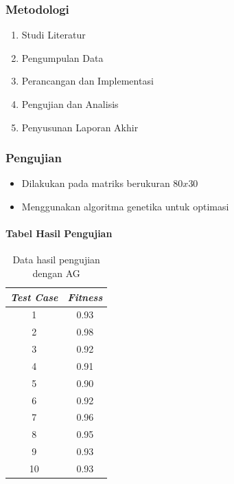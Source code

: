\documentclass[12pt]{beamer}
\begin{document}
	
	\begin{frame}
		\frametitle{Metodologi}
		\begin{enumerate}
			\item Studi Literatur
			\item Pengumpulan Data
			\item Perancangan dan Implementasi
			\item Pengujian dan Analisis
			\item Penyusunan Laporan Akhir
		\end{enumerate}
	\end{frame}
	
	\begin{frame}
		\frametitle{Pengujian}
		\begin{itemize}
			\item Dilakukan pada matriks berukuran $80 x 30$
			\item Menggunakan algoritma genetika untuk optimasi
		\end{itemize}
		\framesubtitle{Tabel Hasil Pengujian}
		\begin{table}
			\centering
			\begin{tabular}{|c|c|}
				\hline \textbf{\emph{Test Case}} & \textbf{\emph{Fitness}} \\ 
				\hline 1 & 0.93 \\ 
				\hline 2 & 0.98 \\ 
				\hline 3 & 0.92 \\ 
				\hline 4 & 0.91 \\ 
				\hline 5 & 0.90 \\ 
				\hline 6 & 0.92 \\ 
				\hline 7 & 0.96 \\ 
				\hline 8 & 0.95 \\ 
				\hline 9 & 0.93 \\ 
				\hline 10 & 0.93 \\ 
				\hline 
			\end{tabular}
			\caption{Data hasil pengujian dengan AG}
			\label{tab:1}
		\end{table}
	\end{frame}
	
\end{document}
